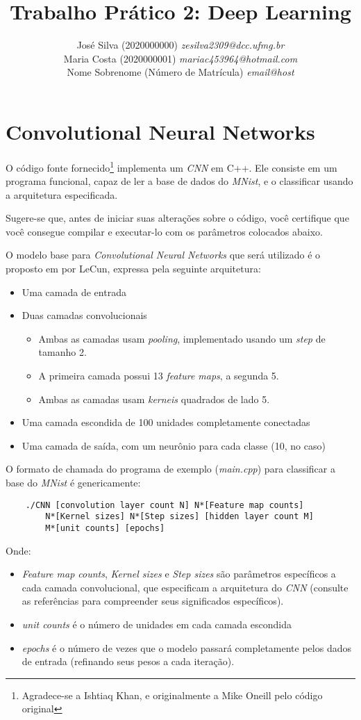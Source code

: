 \documentclass[12pt, a4paper]{article}
\title{Trabalho Prático 2: Deep Learning}
\date{}
\author{
	José Silva  (2020000000) \emph{zesilva2309@dcc.ufmg.br}\\
	Maria Costa (2020000001) \emph{mariac453964@hotmail.com}\\
	Nome Sobrenome (Número de Matrícula) \emph{email@host}	
}
\begin{document}
\maketitle

\section{Convolutional Neural Networks}

O código fonte fornecido\footnote{Agradece-se a Ishtiaq Khan, e originalmente a Mike Oneill pelo código original} implementa um \emph{CNN} em C++. Ele consiste em um programa funcional, capaz de ler a base de dados do \emph{MNist}, e o classificar usando a arquitetura especificada.

Sugere-se que, antes de iniciar suas alterações sobre o código, você certifique que você consegue compilar e executar-lo com os parâmetros colocados abaixo.

O modelo base para \emph{Convolutional Neural Networks} que será utilizado é o proposto em \cite{citeCNN} por LeCun, expressa pela seguinte arquitetura:
\begin{itemize}
\item Uma camada de entrada
\item Duas camadas convolucionais
	\begin{itemize}
		\item Ambas as camadas usam \emph{pooling}, implementado usando um \emph{step} de tamanho 2.
		\item A primeira camada possui 13 \emph{feature maps}, a segunda 5.
		\item Ambas as camadas usam \emph{kerneis} quadrados de lado 5.
	\end{itemize}
\item Uma camada escondida de 100 unidades completamente conectadas
\item Uma camada de saída, com um neurônio para cada classe (10, no caso)
\end{itemize}

O formato de chamada do programa de exemplo (\emph{main.cpp}) para classificar a base do \emph{MNist} é genericamente:
\begin{verbatim}
    ./CNN [convolution layer count N] N*[Feature map counts] 
        N*[Kernel sizes] N*[Step sizes] [hidden layer count M] 
        M*[unit counts] [epochs]
\end{verbatim}

Onde:
\begin{itemize}
	\item \emph{Feature map counts}, \emph{Kernel sizes} e \emph{Step sizes} são parâmetros específicos a cada camada convolucional, que especificam a arquitetura do \emph{CNN} (consulte as referências para compreender seus significados específicos).
	\item \emph{unit counts} é o número de unidades em cada camada escondida
	\item \emph{epochs} é o número de vezes que o modelo passará completamente pelos dados de entrada (refinando seus pesos a cada iteração).
\end{itemize}
\end{document}
